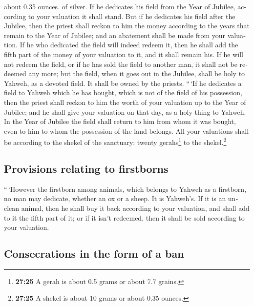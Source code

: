 \begin{paracol}{2}
\begin{otherlanguage}{english}
{  about 0.35 ounces.} of silver.  If he dedicates his
field from the Year of Jubilee, according to your valuation it shall
stand.  But if he dedicates his field after the Jubilee,
then the priest shall reckon to him the money according to the years
that remain to the Year of Jubilee; and an abatement shall be made from
your valuation.  If he who dedicated the field will
indeed redeem it, then he shall add the fifth part of the money of your
valuation to it, and it shall remain his.  If he will not
redeem the field, or if he has sold the field to another man, it shall
not be redeemed any more;  but the field, when it goes
out in the Jubilee, shall be holy to Yahweh, as a devoted field. It
shall be owned by the priests.  ``\,`If he dedicates a
field to Yahweh which he has bought, which is not of the field of his
possession,  then the priest shall reckon to him the
worth of your valuation up to the Year of Jubilee; and he shall give
your valuation on that day, as a holy thing to Yahweh. 
In the Year of Jubilee the field shall return to him from whom it was
bought, even to him to whom the possession of the land belongs.
 All your valuations shall be according to the shekel of
the sanctuary: twenty gerahs\footnote{\textbf{27:25} A gerah is about
  0.5 grams or about 7.7 grains.} to the shekel.\footnote{\textbf{27:25}
  A shekel is about 10 grams or about 0.35 ounces.}

\hypertarget{provisions-relating-to-firstborns}{%
\subsection{Provisions relating to
firstborns}\label{provisions-relating-to-firstborns}}

 ``\,`However the firstborn among animals, which belongs
to Yahweh as a firstborn, no man may dedicate, whether an ox or a sheep.
It is Yahweh's.  If it is an unclean animal, then he
shall buy it back according to your valuation, and shall add to it the
fifth part of it; or if it isn't redeemed, then it shall be sold
according to your valuation.

\hypertarget{consecrations-in-the-form-of-a-ban}{%
\subsection{Consecrations in the form of a
ban}\label{consecrations-in-the-form-of-a-ban}}


\end{otherlanguage}
\end{paracol}
